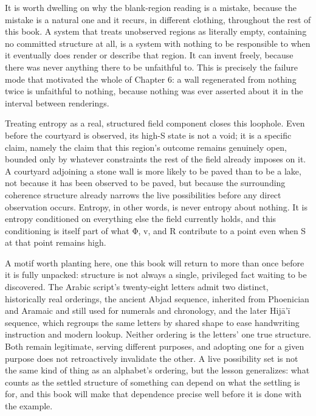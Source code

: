 It is worth dwelling on why the blank-region reading is a mistake, because the mistake is a natural one and it recurs, in different clothing, throughout the rest of this book. A system that treats unobserved regions as literally empty, containing no committed structure at all, is a system with nothing to be responsible to when it eventually does render or describe that region. It can invent freely, because there was never anything there to be unfaithful to. This is precisely the failure mode that motivated the whole of Chapter 6: a wall regenerated from nothing twice is unfaithful to nothing, because nothing was ever asserted about it in the interval between renderings.

Treating entropy as a real, structured field component closes this loophole. Even before the courtyard is observed, its high-S state is not a void; it is a specific claim, namely the claim that this region's outcome remains genuinely open, bounded only by whatever constraints the rest of the field already imposes on it. A courtyard adjoining a stone wall is more likely to be paved than to be a lake, not because it has been observed to be paved, but because the surrounding coherence structure already narrows the live possibilities before any direct observation occurs. Entropy, in other words, is never entropy about nothing. It is entropy conditioned on everything else the field currently holds, and this conditioning is itself part of what Φ, v, and R contribute to a point even when S at that point remains high.

A motif worth planting here, one this book will return to more than once before it is fully unpacked: structure is not always a single, privileged fact waiting to be discovered. The Arabic script's twenty-eight letters admit two distinct, historically real orderings, the ancient Abjad sequence, inherited from Phoenician and Aramaic and still used for numerals and chronology, and the later Hijā'ī sequence, which regroups the same letters by shared shape to ease handwriting instruction and modern lookup. Neither ordering is the letters' one true structure. Both remain legitimate, serving different purposes, and adopting one for a given purpose does not retroactively invalidate the other. A live possibility set is not the same kind of thing as an alphabet's ordering, but the lesson generalizes: what counts as the settled structure of something can depend on what the settling is for, and this book will make that dependence precise well before it is done with the example.

